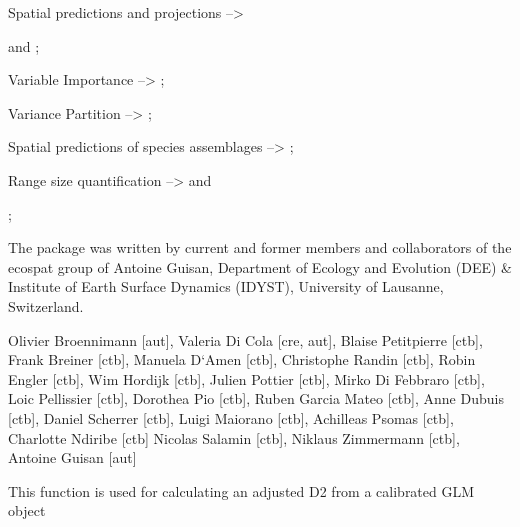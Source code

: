 \documentclass[a4paper]{book}
\begin{document}
\begin{Description}
Spatial predictions and projections -->  



and ;

Variable Importance --> ;


Variance Partition --> ;

Spatial predictions of species assemblages --> ;

Range size quantification -->  and 

;

The  package was written by current and former members and collaborators of the ecospat group of Antoine Guisan, Department of Ecology and Evolution (DEE) \& Institute of Earth Surface Dynamics (IDYST), University of Lausanne, Switzerland. 

\end{Description}
%
\begin{Details}\relax


\end{Details}
%
\begin{Author}\relax
Olivier Broennimann [aut],
Valeria Di Cola [cre, aut],
Blaise Petitpierre [ctb],
Frank Breiner [ctb],
Manuela D`Amen [ctb],
Christophe Randin [ctb],
Robin Engler [ctb],
Wim Hordijk [ctb],
Julien Pottier [ctb],
Mirko Di Febbraro [ctb],
Loic Pellissier [ctb],
Dorothea Pio [ctb],
Ruben Garcia Mateo [ctb],
Anne Dubuis [ctb],
Daniel Scherrer [ctb],
Luigi Maiorano [ctb],
Achilleas Psomas [ctb],
Charlotte Ndiribe [ctb]
Nicolas Salamin [ctb],
Niklaus Zimmermann [ctb],
Antoine Guisan [aut]

\end{Author}
%
\begin{Description}\relax
This function is used for calculating an adjusted D2 from a calibrated GLM object
\end{Description}
\end{document}
